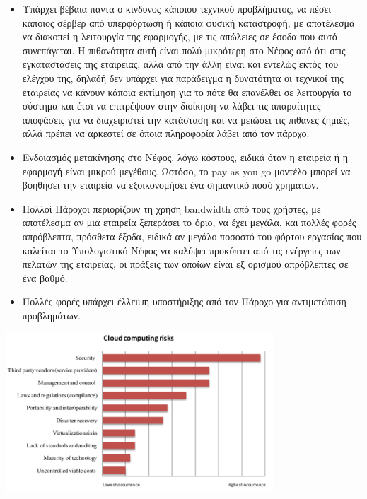 \documentclass{article}
\begin{document}
\begin{itemize}
\item	Υπάρχει βέβαια πάντα ο κίνδυνος κάποιου τεχνικού προβλήματος, να πέσει κάποιος σέρβερ από υπερφόρτωση ή κάποια φυσική καταστροφή, με αποτέλεσμα να διακοπεί η λειτουργία της εφαρμογής, με τις απώλειες σε έσοδα που αυτό συνεπάγεται. Η πιθανότητα αυτή είναι πολύ μικρότερη στο Νέφος από ότι στις εγκαταστάσεις της εταιρείας, αλλά από την άλλη είναι και εντελώς εκτός του ελέγχου της, δηλαδή δεν υπάρχει για παράδειγμα η δυνατότητα οι τεχνικοί της εταιρείας να κάνουν κάποια εκτίμηση για το πότε θα επανέλθει σε λειτουργία το σύστημα και έτσι να επιτρέψουν στην διοίκηση να λάβει τις απαραίτητες αποφάσεις για να διαχειριστεί την κατάσταση και να μειώσει τις πιθανές ζημιές, αλλά πρέπει να αρκεστεί σε όποια πληροφορία λάβει από τον πάροχο.
\item	Ενδοιασμός μετακίνησης στο Νέφος, λόγω κόστους, ειδικά όταν η εταιρεία ή η εφαρμογή είναι μικρού μεγέθους. Ωστόσο, το pay as you go μοντέλο μπορεί να βοηθήσει την εταιρεία να εξοικονομήσει ένα σημαντικό ποσό χρημάτων.
\item	Πολλοί Πάροχοι περιορίζουν τη χρήση bandwidth από τους χρήστες, με αποτέλεσμα αν μια εταιρεία ξεπεράσει το όριο, να έχει μεγάλα, και πολλές φορές απρόβλεπτα, πρόσθετα έξοδα, ειδικά αν μεγάλο ποσοστό του φόρτου εργασίας που καλείται το Υπολογιστικό Νέφος να καλύψει προκύπτει από τις ενέργειες των πελατών της εταιρείας, οι πράξεις των οποίων είναι εξ ορισμού απρόβλεπτες σε ένα βαθμό.
\item	Πολλές φορές υπάρχει έλλειψη υποστήριξης από τον Πάροχο για αντιμετώπιση προβλημάτων.
\end{itemize}


\includegraphics[width=100mm]{images/risks.png}
\end{document}
